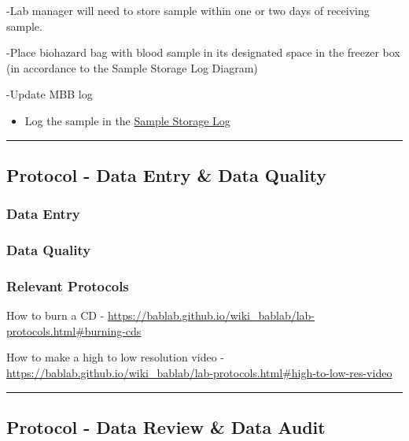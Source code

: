 \documentclass[]{book}
\providecommand{\tightlist}{%
  \setlength{\itemsep}{0pt}\setlength{\parskip}{0pt}}
\begin{document}
-Lab manager will need to store sample within one or two days of receiving sample.

-Place biohazard bag with blood sample in its designated space in the freezer box (in accordance to the Sample Storage Log Diagram)

-Update MBB log

\begin{itemize}
\tightlist
\item
  Log the sample in the \href{https://app.box.com/file/630322897864}{Sample Storage Log}
\end{itemize}

\begin{center}\rule{0.5\linewidth}{0.5pt}\end{center}

\hypertarget{protocol---data-entry-data-quality-1}{%
\subsection{Protocol - Data Entry \& Data Quality}\label{protocol---data-entry-data-quality-1}}

\hypertarget{data-entry-8}{%
\subsubsection{Data Entry}\label{data-entry-8}}

\hypertarget{data-quality-5}{%
\subsubsection{Data Quality}\label{data-quality-5}}

\hypertarget{relevant-protocols-1}{%
\subsubsection{Relevant Protocols}\label{relevant-protocols-1}}

How to burn a CD - \url{https://bablab.github.io/wiki_bablab/lab-protocols.html\#burning-cds}

How to make a high to low resolution video - \url{https://bablab.github.io/wiki_bablab/lab-protocols.html\#high-to-low-res-video}

\begin{center}\rule{0.5\linewidth}{0.5pt}\end{center}

\hypertarget{protocol---data-review-data-audit-1}{%
\subsection{Protocol - Data Review \& Data Audit}\label{protocol---data-review-data-audit-1}}
\end{document}
